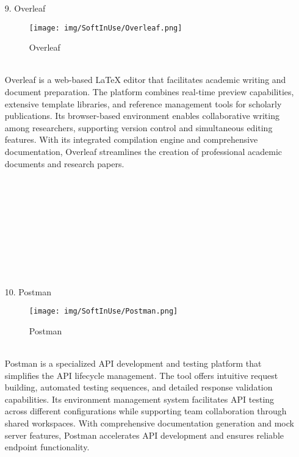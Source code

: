 \documentclass[conference]{IEEEtran}
\begin{document}
\begin{enumerate}
\item[9.] Overleaf
\begin{figure}[h]
\hspace{1.5cm}
\centering
\begin{minipage}{0.5\columnwidth}
    \texttt{[image: img/SoftInUse/Overleaf.png]}
    \caption{Overleaf}
\end{minipage}
\end{figure}\\
Overleaf is a web-based LaTeX editor that facilitates academic writing and document preparation. The platform combines real-time preview capabilities, extensive template libraries, and reference management tools for scholarly publications. Its browser-based environment enables collaborative writing among researchers, supporting version control and simultaneous editing features. With its integrated compilation engine and comprehensive documentation, Overleaf streamlines the creation of professional academic documents and research papers.\\ \\ \\ \\ \\ \\ \\ \\ \\ \\

\item[10.] Postman
\begin{figure}[h]
\hspace{1.5cm}
\centering
\begin{minipage}{0.4\columnwidth}
    \texttt{[image: img/SoftInUse/Postman.png]}
    \caption{Postman}
\end{minipage}
\end{figure}\\
Postman is a specialized API development and testing platform that simplifies the API lifecycle management. The tool offers intuitive request building, automated testing sequences, and detailed response validation capabilities. Its environment management system facilitates API testing across different configurations while supporting team collaboration through shared workspaces. With comprehensive documentation generation and mock server features, Postman accelerates API development and ensures reliable endpoint functionality.\\


\end{enumerate}
\end{document}
